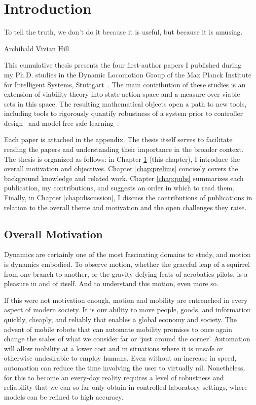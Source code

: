 
\chapter{Introduction} \label{chap:intro}
\epigraph{To tell the truth, we don't do it because it is useful, but because it is amusing.}{Archibald Vivian Hill}

This cumulative thesis presents the four first-author papers I published during my Ph.D. studies in the Dynamic Locomotion Group of the Max Planck Institute for Intelligent Systems, Stuttgart~\cite{heim2018shaping,heim2019beyond,heim2019learnable,heim2018unviable}. The main contribution of these studies is an extension of viability theory into state-action space and a measure over viable sets in this space.
The resulting mathematical objects open a path to new tools, including tools to rigorously quantify robustness of a system prior to controller design~\cite{heim2019beyond} and model-free safe learning~\cite{heim2019learnable}. \par
Each paper is attached in the appendix. The thesis itself serves to facilitate reading the papers and understanding their importance in the broader context. The thesis is organized as follows: in Chapter \ref{chap:intro} (this chapter), I introduce the overall motivation and objectives.
Chapter \ref{chap:prelims} concisely covers the background knowledge and related work.
Chapter \ref{chap:pubs} summarizes each publication, my contributions, and suggests an order in which to read them.
Finally, in Chapter \ref{chap:discussion}, I discuss the contributions of publications in relation to the overall theme and motivation and the open challenges they raise.

\section{Overall Motivation}

Dynamics are certainly one of the most fascinating domains to study, and motion is dynamics embodied. To observe motion, whether the graceful leap of a squirrel from one branch to another, or the gravity defying feats of aerobatics pilots, is a pleasure in and of itself. And to understand this motion, even more so. \par

If this were not motivation enough, motion and mobility are entrenched in every aspect of modern society. It is our ability to move people, goods, and information quickly, cheaply, and reliably that enables a global economy and society. The advent of mobile robots that can automate mobility promises to once again change the scales of what we consider far or `just around the corner'. Automation will allow mobility at a lower cost and in situations where it is unsafe or otherwise undesirable to employ humans. Even without an increase in speed, automation can reduce the time involving the user to virtually nil. Nonetheless, for this to become an every-day reality requires a level of robustness and reliability that we can so far only obtain in controlled laboratory settings, where models can be refined to high accuracy. \par

